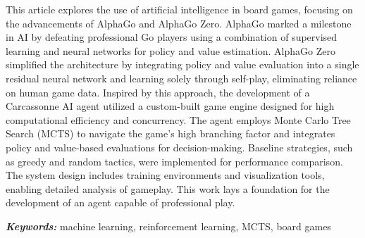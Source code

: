 This article explores the use of artificial intelligence in board games, focusing
on the advancements of AlphaGo\cite{AlphaGoAlgorithm} and AlphaGo Zero\cite{AlphaGoZero}. 
AlphaGo marked a milestone in AI by defeating professional Go players using a 
combination of supervised learning and neural networks for policy and value estimation. 
AlphaGo Zero simplified the architecture by integrating policy and value evaluation 
into a single residual neural network and learning solely through self-play, 
eliminating reliance on human game data. Inspired by this approach, the development 
of a Carcassonne AI agent utilized a custom-built game engine designed for 
high computational efficiency and concurrency. The agent employs Monte Carlo Tree Search (MCTS) 
to navigate the game’s high branching factor and integrates policy and value-based 
evaluations for decision-making. Baseline strategies, such as greedy and random tactics, 
were implemented for performance comparison. The system design includes training 
environments and visualization tools, enabling detailed analysis of gameplay. 
This work lays a foundation for the development of an agent capable of professional play.

\small
\textbf{\textit{Keywords:}} machine learning, reinforcement learning, MCTS, board games
